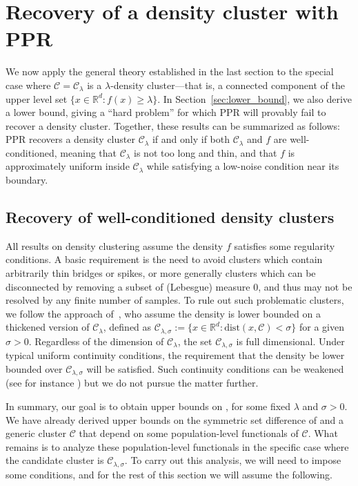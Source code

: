 \documentclass[11pt,twoside]{article}
\newcommand{\Reals}{\mathbb{R}}
\newcommand{\1}{\mathbf{1}}
\newcommand{\Rd}{\Reals^d}
\newcommand{\mc}[1]{\mathcal{#1}}
\newcommand{\wh}[1]{\widehat{#1}}
\newcommand{\dist}{\mathrm{dist}}
\begin{document}
\section{Recovery of a density cluster with PPR}
\label{sec:ppr_density_cluster}
We now apply the general theory established in the last section to the special case where $\mc{C} = \mc{C}_{\lambda}$ is a $\lambda$-density cluster---that is, a connected component of the upper level set $\{x \in \Rd: f(x) \geq \lambda\}$. In Section~\ref{sec:lower_bound}, we also derive a lower bound, giving a ``hard problem'' for which PPR will provably fail to recover a density cluster. Together, these results can be summarized as follows: PPR recovers a density cluster $\mc{C}_{\lambda}$ if and only if both $\mc{C}_{\lambda}$ and $f$ are well-conditioned, meaning that $\mc{C}_{\lambda}$ is not too long and thin, and that $f$ is approximately uniform inside $\mc{C}_{\lambda}$ while satisfying a low-noise condition near its boundary.

\subsection{Recovery of well-conditioned density clusters}
\label{subsec:recovery_well-conditioned_density_clusters}

All results on density clustering assume the density $f$ satisfies some regularity conditions. A basic requirement is the need to avoid clusters which contain arbitrarily thin bridges or spikes, or more generally clusters which can be disconnected by removing a subset of (Lebesgue) measure $0$, and thus may not be resolved by any finite number of samples. To rule out such problematic clusters, we follow the approach of~\cite{chaudhuri2010}, who assume the density is lower bounded on a thickened version of $\mc{C}_{\lambda}$, defined as $\mc{C}_{\lambda,\sigma} := \{x \in \Rd: \dist(x,\mc{C}) < \sigma\}$ for a given $\sigma > 0$. Regardless of the dimension of $\mc{C}_{\lambda}$, the set $\mc{C}_{\lambda,\sigma}$ is full dimensional. Under typical uniform continuity conditions, the requirement that the density be lower bounded over $\mc{C}_{\lambda,\sigma}$ will be satisfied. Such continuity conditions can be weakened (see for instance \citet{rinaldo2010,steinwart2015}) but we do not pursue the matter further.

In summary, our goal is to obtain upper bounds on \smash{$\Delta(\wh{C},\mc{C}_{\lambda,\sigma}[X])$}, for some fixed $\lambda$ and $\sigma > 0$. We have already derived upper bounds on the symmetric set difference of \smash{$\wh{C}$} and a generic cluster $\mc{C}$ that depend on some population-level functionals of $\mc{C}$. What remains is to analyze these population-level functionals in the specific case where the candidate cluster is $\mc{C}_{\lambda,\sigma}$. To carry out this analysis, we will need to impose some conditions, and for the rest of this section we will assume the following.
\end{document}
